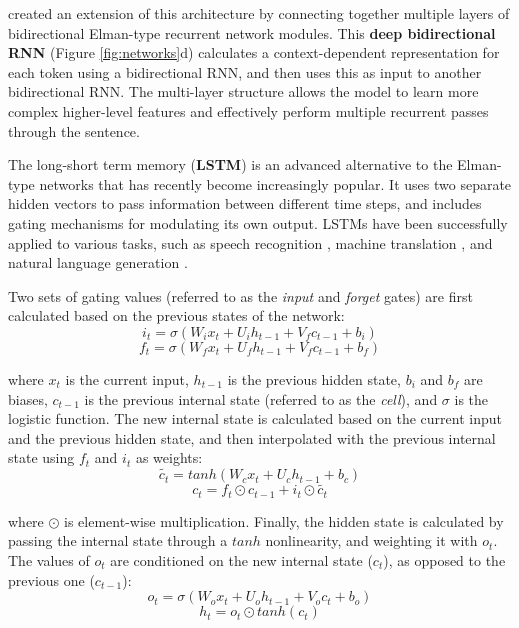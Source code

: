\documentclass[11pt]{article}
\begin{document}
 created an extension of this architecture by connecting together multiple layers of bidirectional Elman-type recurrent network modules. This \textbf{deep bidirectional RNN} (Figure \ref{fig:networks}d) calculates a context-dependent representation for each token using a bidirectional RNN, and then uses this as input to another bidirectional RNN.
The multi-layer structure allows the model to learn more complex higher-level features and effectively perform multiple recurrent passes through the sentence.



The long-short term memory (\textbf{LSTM}) \cite{Hochreiter1997} is an advanced alternative to the Elman-type networks that has recently become increasingly popular. 
It uses two separate hidden vectors to pass information between different time steps, and includes gating mechanisms for modulating its own output.
LSTMs have been successfully applied to various tasks, such as speech recognition \cite{Graves2013a}, machine translation \cite{Luong2015}, and natural language generation \cite{Wen2015}. 



Two sets of gating values (referred to as the \textit{input} and \textit{forget} gates) are first calculated based on the previous states of the network:
\begin{equation}
i_t = \sigma(W_i x_t + U_i h_{t-1} + V_f c_{t-1} + b_i)
\end{equation}
\begin{equation}
f_t = \sigma(W_f x_t + U_f h_{t-1} + V_f c_{t-1} + b_f)
\end{equation}

\noindent where $x_t$ is the current input, $h_{t-1}$ is the previous hidden state, $b_i$ and $b_f$ are biases, $c_{t-1}$ is the previous internal state (referred to as the \textit{cell}), and $\sigma$ is the logistic function.
The new internal state is calculated based on the current input and the previous hidden state, and then interpolated with the previous internal state using $f_t$ and $i_t$
 as weights:
\begin{equation}
\widetilde{c_t} = tanh(W_c x_t + U_c h_{t-1} + b_c)
\end{equation}
\begin{equation}
\label{eq:lstm_interpolation}
c_t = f_t \odot c_{t-1} + i_t \odot \widetilde{c_t}
\end{equation}

\noindent where $\odot$ is element-wise multiplication.
Finally, the hidden state is calculated by passing the internal state through a $tanh$ nonlinearity, and weighting it with $o_t$. The values of $o_t$ are conditioned on the new internal state ($c_{t}$), as opposed to the previous one ($c_{t-1}$):
\begin{equation}
o_t = \sigma(W_o x_t + U_o h_{t-1} + V_o c_{t} + b_o)
\end{equation}
\begin{equation}
h_t = o_t \odot tanh(c_t)
\end{equation}
\end{document}
